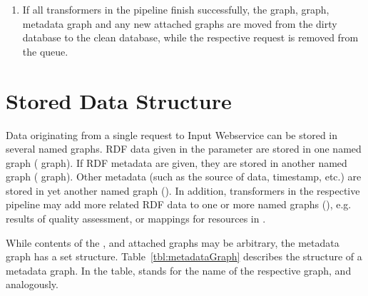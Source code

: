 {\begin{enumerate}
	\begin{enumerate}[label=(\emph{\roman*})]
	  \item Named graphs $A$ and $B$ have the same update tag, or both have an unspecified () update tag.
	  \item Named graphs $A$ and $B$ were inserted by the same (SCR) user.
	  \item Named graphs $A$ and $B$ have the same set of sources in metadata.
	  \item Named graph $A$ was inserted later than named graph $B$.
	\end{enumerate}

	The  named graph is marked as the latest version by adding a triple with predicate  to the  graph. If the currently processed data update a named graph already stored in the clean database, this triple is removed for the older graph.

  \item If all transformers in the pipeline finish successfully, the  graph,  graph, metadata graph and any new attached graphs are moved from the dirty database to the clean database, while the respective request is removed from the queue.


\end{enumerate}

\section{Stored Data Structure}
\label{sec:storedDataStructure}

Data originating from a single request to Input Webservice can be stored in several named graphs. RDF data given in the  parameter are stored in one named graph ( graph). If  RDF metadata are given, they are stored in another named graph ( graph). Other metadata (such as the source of data, timestamp, etc.) are stored in yet another named graph ().
In addition, transformers in the respective pipeline may add more related RDF data to one or more named graphs (), e.g. results of quality assessment, or mappings for resources in . 

While contents of the ,  and attached graphs may be arbitrary, the metadata graph has a set structure. Table~\ref{tbl:metadataGraph} describes the structure of a metadata graph. In the table,  stands for the name of the respective  graph,  and  analogously.


}
